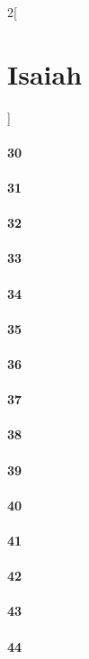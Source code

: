 \documentclass{book}
\begin{document}
\begin{multicols}{2}[\part{Isaiah}]
\subsection*{30}
\subsection*{31}
\subsection*{32}
\subsection*{33}
\subsection*{34}
\subsection*{35}
\subsection*{36}
\subsection*{37}
\subsection*{38}
\subsection*{39}
\subsection*{40}
\subsection*{41}
\subsection*{42}
\subsection*{43}
\subsection*{44}

\end{multicols}
\end{document}
